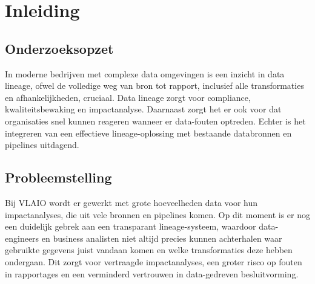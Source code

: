 


% 

\section{Inleiding}%
\label{sec:inleiding}

\subsection{Onderzoeksopzet}

In moderne bedrijven met complexe data omgevingen is een inzicht in data lineage, ofwel de volledige weg van bron tot rapport, inclusief alle transformaties en afhankelijkheden, cruciaal. Data lineage zorgt voor compliance, kwaliteitsbewaking en impactanalyse. Daarnaast zorgt het er ook voor dat organisaties snel kunnen reageren wanneer er data-fouten optreden. Echter is het integreren van een effectieve lineage-oplossing met bestaande databronnen en pipelines  uitdagend.

\subsection{Probleemstelling}

Bij VLAIO wordt er gewerkt met grote hoeveelheden data voor hun impactanalyses, die uit vele bronnen en pipelines komen. Op dit moment is er nog een duidelijk gebrek aan een transparant lineage-systeem, waardoor data-engineers en business analisten niet altijd precies kunnen achterhalen waar gebruikte gegevens juist vandaan komen en welke transformaties deze hebben ondergaan. Dit zorgt voor vertraagde impactanalyses, een groter risco op fouten in rapportages en een verminderd vertrouwen in data-gedreven besluitvorming.

